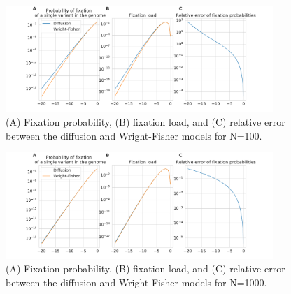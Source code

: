 \documentclass[review,nonatbib]{elsarticle}
\begin{document}
\begin{figure}[H]
  \centering
  \includegraphics[width=0.9\textwidth]{fig/fixation_rate_N_100.pdf}

    \caption{(A) Fixation probability, (B) fixation load, and (C) relative error between the
    diffusion and Wright-Fisher models for N=100.}

  \label{fig_apx_fixation_100}

\end{figure}

\begin{figure}[H]
  \centering
  \includegraphics[width=0.9\textwidth]{fig/fixation_rate_N_1000.pdf}

    \caption{(A) Fixation probability, (B) fixation load, and (C) relative error between the
    diffusion and Wright-Fisher models for N=1000.}

  \label{fig_apx_fixation_1000}

\end{figure}
\end{document}
